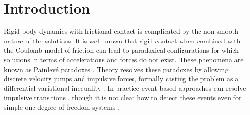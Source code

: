 %
%
%

\section{Introduction}
\label{sec:introduction}


Rigid body dynamics with frictional contact is complicated by the non-smooth
nature of the solutions. It is well known \cite{bib:baraff1993issues} that rigid
contact when combined with the Coulomb model of friction can lead to paradoxical
configurations for which solutions in terms of accelerations and forces
do not exist. These phenomena are known as Painlev\'e paradoxes
\cite{bib:hogan2017regularization}. Theory resolves these paradoxes by allowing
discrete velocity jumps and impulsive forces, formally casting the problem as a
differential variational inequality \cite{bib:pang2008differential}. In practice
event based approaches can resolve impulsive transitions \cite{bib:haug1986},
though it is not clear how to detect these events even for simple one degree of
freedom systems \cite{bib:hogan2017regularization}.

